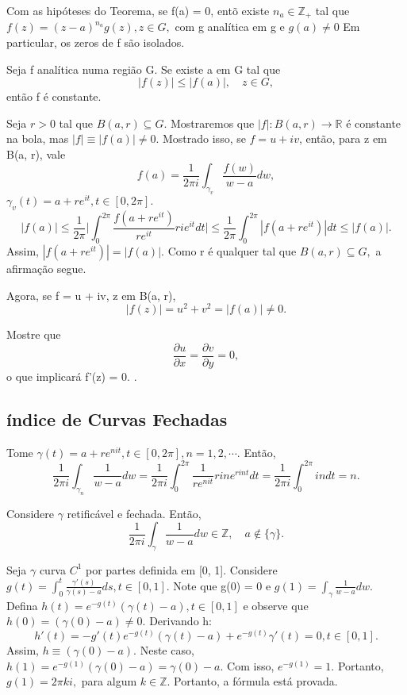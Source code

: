 \documentclass[ComplexAnalysis/complex.tex]{subfiles}
\begin{document}
\begin{crl*}
	Com as hipóteses do Teorema, se f(a) = 0, entõ existe $n_a\in \mathbb{Z}_{+}$ tal que $f(z) = (z-a)^{n_a}g(z), z\in{G},$
	com g analítica em g e $g(a)\neq0$ Em particular, os zeros de f são isolados.
\end{crl*}
\begin{theorem*}
	Seja f analítica numa região G. Se existe a em G tal que
	$$
		|f(z)|\leq|f(a)|, \quad z\in{G},
	$$
	então f é constante.
\end{theorem*}
\begin{proof*}
	Seja $r > 0$ tal que $B(a, r)\subseteq{G}.$ Mostraremos que $|f|:B(a, r)\rightarrow \mathbb{R}$ é constante na bola, mas $|f|\equiv|f(a)|\neq0.$
	Mostrado isso, se $f = u + iv$, então, para z em B(a, r), vale
	$$
		f(a) = \frac{1}{2\pi i}\int_{\gamma_{v}}^{}\frac{f(w)}{w-a}dw,
	$$
	$\gamma_{v}(t) = a + re^{it}, t\in[0, 2\pi].$
	$$
		|f(a)|\leq \frac{1}{2\pi}\biggl|\int_{0}^{2\pi}\frac{f(a + re^{it})}{re^{it}}rie^{it}dt\biggr|\leq \frac{1}{2\pi}\int_{0}^{2\pi}|f(a + re^{it})|dt
		\leq |f(a)|.
	$$
	Assim, $|f(a+re^{it})| = |f(a)|.$ Como r é qualquer tal que $B(a, r)\subseteq{G},$ a afirmação segue.

	Agora, se f = u + iv, z em B(a, r),
	$$
		|f(z)| = u^{2} + v^{2} = |f(a)|\neq 0.
	$$
	\begin{exer*}
		Mostre que
		$$
			\frac{\partial{u}}{\partial{x}} = \frac{\partial{v}}{\partial{y}} = 0,
		$$
		o que implicará f'(z) = 0. \qedsymbol.
	\end{exer*}
\end{proof*}
\subsection{índice de Curvas Fechadas}
\begin{example}
	Tome $\gamma(t) = a + re^{nit}, t\in[0, 2\pi], n=1, 2, \cdots$. Então,
	$$
		\frac{1}{2\pi i}\int_{\gamma_{n}}^{}\frac{1}{w-a}dw = \frac{1}{2\pi  i}\int_{0}^{2\pi}\frac{1}{re^{nit}}rine^{rint}dt = \frac{1}{2\pi i}\int_{0}^{2\pi} indt = n.
	$$
\end{example}
\begin{prop*}
	Considere $\gamma$ retificável e fechada. Então,
	$$
		\frac{1}{2\pi i}\int_{\gamma}^{}\frac{1}{w-a}dw\in \mathbb{Z}, \quad a\not\in \{\gamma\}.
	$$
\end{prop*}
\begin{proof*}
	Seja $\gamma$ curva $C^{1}$ por partes definida em [0, 1]. Considere $g(t) = \int_{0}^{t}\frac{\gamma'(s)}{\gamma(s) - a}ds, t\in[0, 1].$
	Note que g(0) = 0 e $g(1) = \int_{\gamma}^{}\frac{1}{w-a}dw.$ Defina $h(t) = e^{-g(t)}(\gamma(t) - a), t\in[0, 1]$ e observe que
	$h(0) = (\gamma(0) - a)\neq0.$ Derivando h:
	$$
		h'(t) = -g'(t)e^{-g(t)}(\gamma(t) - a) + e^{-g(t)}\gamma'(t) = 0, t\in[0, 1].
	$$
	Assim, $h\equiv{(\gamma(0) - a)}$. Neste caso, $h(1) = e^{-g(1)}(\gamma(0)-a) = \gamma(0) - a.$ Com isso, $e^{-g(1)} = 1.$ Portanto,
	$g(1) = 2\pi ki,$ para algum $k\in \mathbb{Z}.$ Portanto, a fórmula está provada. \qedsymbol
\end{proof*}
\end{document}
